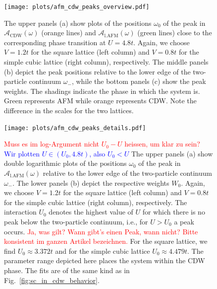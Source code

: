 \documentclass[
    reprint, 
    aps,
    preprintnumbers,
    twocolumn,
    prb,
    superscriptaddress
]{revtex4-2}
\newcommand{\spectral}[1]{\mathcal{A}_\text{#1}  (\omega)}
\newcommand{\red}[1]{\textcolor{red}{#1}}
\newcommand{\blue}[1]{\textcolor{blue}{#1}}
\begin{document}
\begin{figure}
    \centering
    \texttt{[image: plots/afm\_cdw\_peaks\_overview.pdf]}
    \caption{The upper panels (a) show plots of the positions $\omega_0$ of the peak in $\spectral{CDW}$ (orange lines) 
		and $\spectral{l.AFM}$ (green lines) close to the corresponding phase transition 
		at $U = 4.8t$.   Again, we choose $V=1.2t$ for the square lattice (left column) and $V=0.8t$ for the simple cubic lattice (right column), respectively.
    The middle panels (b) depict the peak positions relative to the lower edge of the two-particle continuum 
		$\omega_-$, while the bottom panels (c) show the peak weights.
    The shadings indicate the phase in which the system is. Green represents AFM while orange represents CDW.
    Note the difference in the scales for the two lattices.}
    \label{fig:afm_cdw_peaks_overview}
\end{figure}


\begin{figure}
    \centering
    \texttt{[image: plots/afm\_cdw\_peaks\_details.pdf]}
    \caption{\red{Muss es im log-Argument nicht $U_0-U$ heissen, um klar zu sein?}  \blue{Wir plotten $U\in(U_0, 4.8t)$, also $U_0 < U$}
		The upper panels (a) show double logarithmic plots of the positions $\omega_0$ 
		of the peak in $\spectral{l.AFM}$ relative to the lower edge of the two-particle continuum $\omega_-$.
    The lower panels (b) depict the respective weights $W_0$.
    Again, we choose $V=1.2t$ for the square lattice (left column) and 
		$V=0.8t$ for the simple cubic lattice (right column), respectively.
    The interaction $U_0$ denotes the highest value of $U$ for which 
		there is no peak below the two-particle continuum, i.e., for $U> U_0$ a peak occurs.
		\red{Ja, was gilt? Wann gibt's einen Peak, wann nicht? Bitte konsistent im ganzen Artikel bezeichnen.}
    For the square lattice, we find $U_0 \approx 3.372t$ and for the simple cubic lattice $U_0 \approx 4.479t$.
    The parameter range depicted here places the system within the CDW phase.
    The fits are of the same kind as in Fig.\ \ref{fig:sc_in_cdw_behavior}.}
    \label{fig:afm_cdw_peaks_details}
\end{figure}

\end{document}
